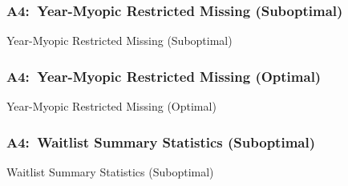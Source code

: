 \documentclass[12pt, aspectratio=169]{beamer}
\begin{document}
\begin{frame}[label=ymrms]
\frametitle{A4:\ Year-Myopic Restricted Missing (Suboptimal)}
\begin{table}[htbp]
  \centering
  \renewcommand{\thetable}{\arabic{table}a}
  \caption{Year-Myopic Restricted Missing (Suboptimal)}
  \vspace{5pt}
  \begin{adjustbox}{totalheight=.7\textheight}

  \end{adjustbox}
\end{table}%
\hyperlink{ysres}{}
\end{frame}

\begin{frame}[label=ymrmo]
\frametitle{A4:\ Year-Myopic Restricted Missing (Optimal)}
\addtocounter{framenumber}{-1}
\begin{table}[htbp]
  \centering
  \addtocounter{table}{-1}
  \renewcommand{\thetable}{\arabic{table}b}
  \caption{Year-Myopic Restricted Missing (Optimal)}
  \vspace{5pt}
  \begin{adjustbox}{totalheight=.7\textheight}

  \end{adjustbox}
\end{table}%
\hyperlink{ysreo}{}
\end{frame}

\begin{frame}[label=wsss]
\frametitle{A4:\ Waitlist Summary Statistics (Suboptimal)}
\begin{table}[htbp]
  \centering
  \vspace{-5pt}
  \renewcommand{\thetable}{\arabic{table}a}
  \caption{Waitlist Summary Statistics (Suboptimal)}
  \vspace{5pt}
  \begin{adjustbox}{totalheight=.7\textheight}

  \end{adjustbox}
\end{table}%
\hyperlink{wdues}{}
\end{frame}
\end{document}

